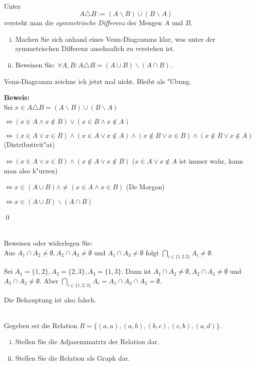 \\
  Unter 
  \[A\triangle B:=(A\backslash B)\cup (B\backslash A)\] versteht man die \textit{symmetrische Differenz} der Mengen $A$ und $B$.
  \begin{enumerate}[(i)]
    \item Machen Sie sich anhand eines Venn-Diagramms klar, was unter der symmetrischen Differenz anschaulich zu verstehen ist.
    \item Beweisen Sie: $\forall A,B:A\triangle B=(A\cup B)\backslash(A\cap B)$.
  \end{enumerate}

\begin{loesung}
Venn-Diagramm zeichne ich jetzt mal nicht. Bleibt als "Ubung.

\textbf{Beweis:}\\
Sei $x\in A\triangle B=(A\backslash B)\cup (B\backslash A)$

$\Leftrightarrow (x\in A\wedge x\notin B)\vee (x\in B\wedge x\notin A)$

$\Leftrightarrow (x\in A\vee x\in B)\wedge (x\in A\vee x\notin A)\wedge (x\notin B\vee x\in B)\wedge (x\notin B\vee x\notin A)$ (Distributivit"at)

$\Leftrightarrow (x\in A\vee x\in B)\wedge (x\notin A\vee x\notin B)$ ($x\in A\vee x\notin A$ ist immer wahr, kann man also k"urzen)

$\Leftrightarrow x\in (A\cup B)\wedge \neq (x\in A\wedge x\in B)$ (De Morgan)

$\Leftrightarrow x\in(A\cup B)\backslash(A\cap B)$

\qed
\end{loesung}

 \\
Beweisen oder widerlegen Sie:\\
Aus $A_1\cap A_2\neq\emptyset, A_2\cap A_3\neq\emptyset$ und $A_1\cap A_3\neq\emptyset$ folgt $\bigcap_{i\in\{1.2.3\}}A_i\neq\emptyset$.

\begin{loesung}
  Sei $A_1=\{1,2\}, A_2=\{2,3\},A_3=\{1,3\}$. Dann ist $A_1\cap A_2\neq\emptyset, A_2\cap A_3\neq\emptyset$ und $A_1\cap A_2\neq \emptyset$. 
  Aber $\bigcap_{i\in\{1,2,3\}}A_i=A_1\cap A_2\cap A_3=\emptyset$. 
  
  Die Behauptung ist also falsch.
\end{loesung}
\\
Gegeben sei die Relation $R=\{(a,a),(a,b),(b,c),(c,b),(a,d)\}$.
\begin{enumerate}[(i)]
  \item Stellen Sie die Adjazenzmatrix der Relation dar.
  \item Stellen Sie die Relation als Graph dar.
\end{enumerate}

